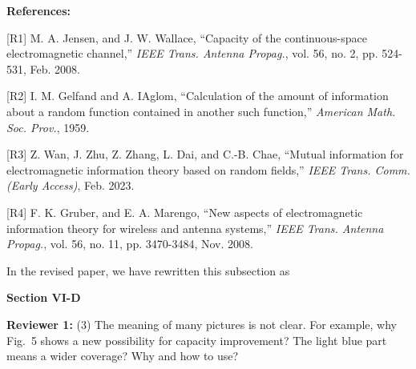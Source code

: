 \documentclass[a4paper,12pt]{article}
\newcommand{\red}[1]{{\color{red}{#1}}}
\begin{document}
{{\bf References:}

[R1] M. A. Jensen, and J. W. Wallace, ``Capacity of the continuous-space electromagnetic channel,'' {\it IEEE Trans. Antenna Propag.}, vol. 56, no. 2, pp. 524-531, Feb. 2008. 

[R2] I. M. Gelfand and A. IAglom, ``Calculation of the amount of information about a random function contained in another such function,'' {\it American Math. Soc. Prov.}, 1959. 

[R3] Z. Wan, J. Zhu, Z. Zhang, L. Dai, and C.-B. Chae, ``Mutual information for electromagnetic information theory based on random fields,'' {\it IEEE Trans. Comm. (Early Access)}, Feb. 2023. 

[R4] F. K. Gruber, and E. A. Marengo, ``New aspects of electromagnetic information theory for wireless and antenna systems,'' {\it IEEE Trans. Antenna Propag.}, vol. 56, no. 11, pp. 3470-3484, Nov. 2008. 

\quad In the revised paper, we have rewritten this subsection as 

}

\begin{framed}
    {\bf Section VI-D} \\
    \red{In classical information theory, the ``capacity'' is defined as the supremum of all the operationally achievable transmission rates. It is favorable that in discrete memoryless systems, the capacity equals the maximum mutual information, but this conclusion is generally not true for all kinds of channels. In the existing works on EIT~[7, 8, 14], maximum mutual information values are calculated under the assumptions of monochromatic waves, linear deterministic EM channels and continuous transceivers. Unfortunately, these mutual information values only serve as an upper bound to the EM capacity. 
    Thus, in the strict sense, the EM capacity is still an open problem. } 
\end{framed}




\textbf{Reviewer 1:}
(3) The meaning of many pictures is not clear. For example, why Fig.~5 shows a new possibility for capacity improvement? The light blue part means a wider coverage? Why and how to use? 
\end{document}
